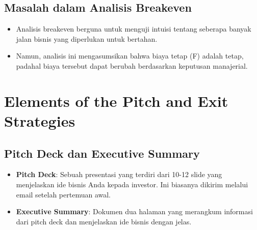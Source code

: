 \documentclass{article}
\begin{document}
\subsection{Masalah dalam Analisis Breakeven}
\begin{itemize}
    \item Analisis breakeven berguna untuk menguji intuisi tentang seberapa banyak jalan bisnis yang diperlukan untuk bertahan.
    \item Namun, analisis ini mengasumsikan bahwa biaya tetap (F) adalah tetap, padahal biaya tersebut dapat berubah berdasarkan keputusan manajerial.
\end{itemize}

\newpage

\section{Elements of the Pitch and Exit Strategies}
\subsection{Pitch Deck dan Executive Summary}
\begin{itemize}
    \item \textbf{Pitch Deck}: Sebuah presentasi yang terdiri dari 10-12 slide yang menjelaskan ide bisnis Anda kepada investor. Ini biasanya dikirim melalui email setelah pertemuan awal.
    \item \textbf{Executive Summary}: Dokumen dua halaman yang merangkum informasi dari pitch deck dan menjelaskan ide bisnis dengan jelas.
\end{itemize}
\end{document}
